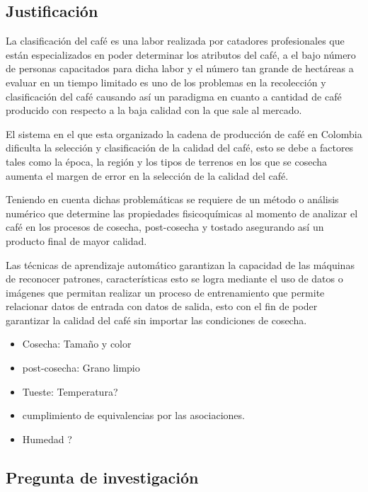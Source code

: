 \subsection{Justificación}

La clasificación del café es una labor realizada por catadores profesionales que están especializados en poder determinar los atributos del café, a el bajo número de personas capacitados para dicha labor y el número tan grande de hectáreas a evaluar en un tiempo limitado es uno de los problemas en la recolección y clasificación del café causando así un paradigma en cuanto a cantidad de café producido con respecto a la baja calidad con la que sale al mercado. \medskip

El sistema en el que esta organizado la cadena de producción de café en Colombia dificulta la selección y clasificación de la calidad del café, esto se debe a factores tales como la época, la región y los tipos de terrenos en los que se cosecha aumenta el margen de error en la selección de la calidad del café. \medskip
 
Teniendo en cuenta dichas problemáticas se requiere de un método o análisis numérico que determine las propiedades fisicoquímicas al momento de analizar el café en los procesos de cosecha, post-cosecha y tostado asegurando así un producto final de mayor calidad. \medskip

Las técnicas de aprendizaje automático garantizan la capacidad de las máquinas de reconocer patrones, características esto se logra mediante el uso de datos o imágenes que permitan realizar un proceso de entrenamiento que permite relacionar datos de entrada con datos de salida, esto con el fin de poder garantizar la calidad del café sin importar las condiciones de cosecha.

\begin{itemize}
    \item Cosecha: Tamaño y color %
    \item post-cosecha: Grano limpio %
    \item Tueste: Temperatura? %
    \item cumplimiento de equivalencias por las asociaciones.
    \item Humedad ? 
\end{itemize}

\subsection{Pregunta de investigación}

